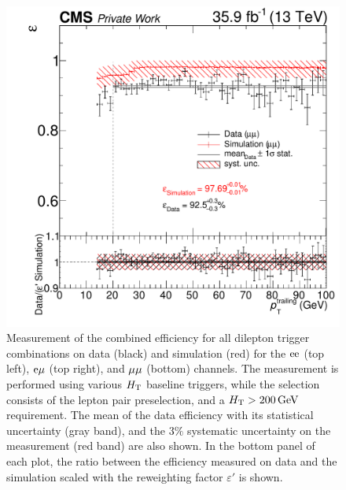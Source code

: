\begin{figure}[htb]
 \includegraphics[width=\pairwidth]{figures/triggerStudies/efficiency_dataHT_trigDilep_MM_pt2}
 \caption{Measurement of the combined efficiency for all dilepton trigger combinations on data (black) and simulation (red) for the $\mathrm{e}\mathrm{e}$ (top left), $\mathrm{e}\mu$ (top right), and $\mu\mu$ (bottom) channels. The measurement is performed using various $H_{\mathrm{T}}$ baseline triggers, while the selection consists of the lepton pair preselection, and a $H_{\mathrm{T}}>200\,\text{Ge\hspace{-.08em}V}$ requirement. The mean of the data efficiency with its statistical uncertainty (gray band), and the $3\%$ systematic uncertainty on the measurement (red band) are also shown. In the bottom panel of each plot, the ratio between the efficiency measured on data and the simulation scaled with the reweighting factor $\varepsilon'$ is shown.}
 \label{fig:triggEff}
\end{figure}


